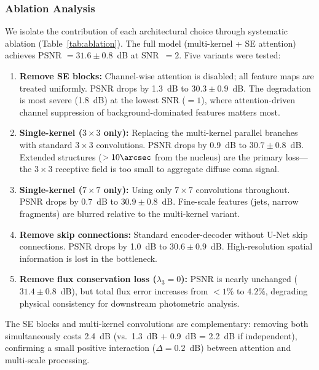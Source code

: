 \documentclass[preprint2]{aastex631}
\begin{document}
\subsubsection{Ablation Analysis}

We isolate the contribution of each architectural choice through systematic ablation (Table~\ref{tab:ablation}). The full model (multi-kernel + SE attention) achieves PSNR $= 31.6 \pm 0.8$~dB at SNR~$=2$. Five variants were tested:

\begin{enumerate}
    \item \textbf{Remove SE blocks:} Channel-wise attention is disabled; all feature maps are treated uniformly. PSNR drops by 1.3~dB to $30.3 \pm 0.9$~dB. The degradation is most severe (1.8~dB) at the lowest SNR ($=1$), where attention-driven channel suppression of background-dominated features matters most.
    \item \textbf{Single-kernel ($3\times3$ only):} Replacing the multi-kernel parallel branches with standard $3\times3$ convolutions. PSNR drops by 0.9~dB to $30.7 \pm 0.8$~dB. Extended structures ($>10\arcsec$ from the nucleus) are the primary loss---the $3\times3$ receptive field is too small to aggregate diffuse coma signal.
    \item \textbf{Single-kernel ($7\times7$ only):} Using only $7\times7$ convolutions throughout. PSNR drops by 0.7~dB to $30.9 \pm 0.8$~dB. Fine-scale features (jets, narrow fragments) are blurred relative to the multi-kernel variant.
    \item \textbf{Remove skip connections:} Standard encoder-decoder without U-Net skip connections. PSNR drops by 1.0~dB to $30.6 \pm 0.9$~dB. High-resolution spatial information is lost in the bottleneck.
    \item \textbf{Remove flux conservation loss ($\lambda_3 = 0$):} PSNR is nearly unchanged ($31.4 \pm 0.8$~dB), but total flux error increases from $<1\%$ to $4.2\%$, degrading physical consistency for downstream photometric analysis.
\end{enumerate}

The SE blocks and multi-kernel convolutions are complementary: removing both simultaneously costs 2.4~dB (vs.\ 1.3~dB + 0.9~dB = 2.2~dB if independent), confirming a small positive interaction ($\Delta = 0.2$~dB) between attention and multi-scale processing.
\end{document}
